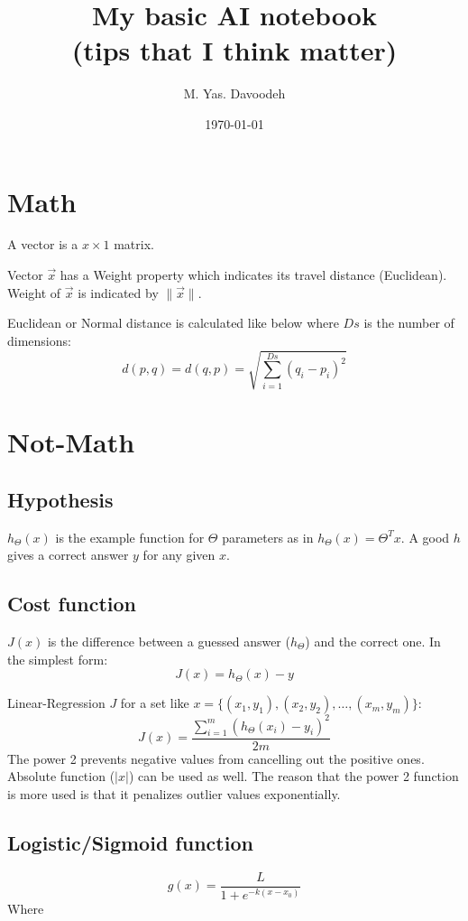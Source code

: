 \documentclass[professionalfont, a5paper]{article}
\author{M. Yas. Davoodeh}
\title{My basic AI notebook \\(tips that I think matter)}
\date{\today}
\begin{document}
\maketitle

\section{Math}
A vector is a $x\times1$ matrix.

Vector $\vec{x}$ has a Weight property which indicates its travel distance (Euclidean).
Weight of $\vec{x}$ is indicated by $\|\vec{x}\|$.

Euclidean or Normal distance is calculated like below where $Ds$ is the number of dimensions:
\begin{equation}
  d(p, q) = d(q, p) = \sqrt{\sum_{i=1}^{Ds}(q_{i}-p_{i})^{2}}
\end{equation}

\section{Not-Math}
\subsection{Hypothesis}
$h_{\Theta}(x)$ is the example function for $\Theta$ parameters as in $h_{\Theta}(x) = \Theta^{T}x$.
A good $h$ gives a correct answer $y$ for any given $x$.

\subsection{Cost function}
$J(x)$ is the difference between a guessed answer ($h_{\Theta}$) and the correct one.
In the simplest form:
\begin{equation}
  J(x) = h_{\Theta}(x) - y
\end{equation}

Linear-Regression $J$ for a set like $x= \{(x_{1}, y_{1}), (x_{2}, y_{2}), \dots, (x_{m}, y_{m})\}$:
\begin{equation}
  J(x) = \frac{\sum_{i=1}^{m}(h_{\Theta}(x_{i}) - y_{i})^{2}}{2m}
\end{equation}
The power 2 prevents negative values from cancelling out the positive ones.
Absolute function ($|x|$) can be used as well. The reason that the power 2 function is more used is that it penalizes outlier values exponentially.

\subsection{Logistic/Sigmoid function}
\begin{equation}
  g(x) = \frac{L}{1+e^{-k(x-x_{0})}}
\end{equation}
\setlength{\leftskip}{1cm}
Where
\end{document}
